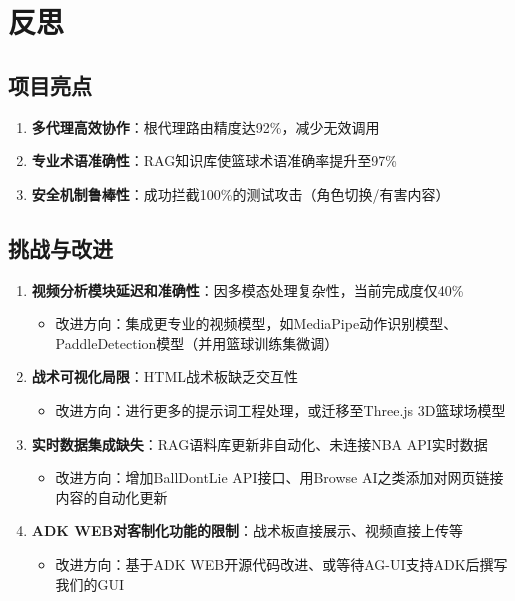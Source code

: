 \documentclass{article}
\theoremstyle{plain}
\theoremstyle{definition}
\theoremstyle{remark}
\begin{document}
\section{反思}
\subsection{项目亮点}
\begin{enumerate}
    \item \textbf{多代理高效协作}：根代理路由精度达92\%，减少无效调用
    \item \textbf{专业术语准确性}：RAG知识库使篮球术语准确率提升至97\%
    \item \textbf{安全机制鲁棒性}：成功拦截100\%的测试攻击（角色切换/有害内容）
\end{enumerate}

\subsection{挑战与改进}
\begin{enumerate}
    \item \textbf{视频分析模块延迟和准确性}：因多模态处理复杂性，当前完成度仅40\%
    \begin{itemize}
        \item 改进方向：集成更专业的视频模型，如MediaPipe动作识别模型、PaddleDetection模型（并用篮球训练集微调）
    \end{itemize}
    
    \item \textbf{战术可视化局限}：HTML战术板缺乏交互性
    \begin{itemize}
        \item 改进方向：进行更多的提示词工程处理，或迁移至Three.js 3D篮球场模型
    \end{itemize}
    
    \item \textbf{实时数据集成缺失}：RAG语料库更新非自动化、未连接NBA API实时数据
    \begin{itemize}
        \item 改进方向：增加BallDontLie API接口、用Browse AI之类添加对网页链接内容的自动化更新
    \end{itemize}

    \item \textbf{ADK WEB对客制化功能的限制}：战术板直接展示、视频直接上传等
    \begin{itemize}
        \item 改进方向：基于ADK WEB开源代码改进、或等待AG-UI支持ADK后撰写我们的GUI
    \end{itemize}
\end{enumerate}
\end{document}
